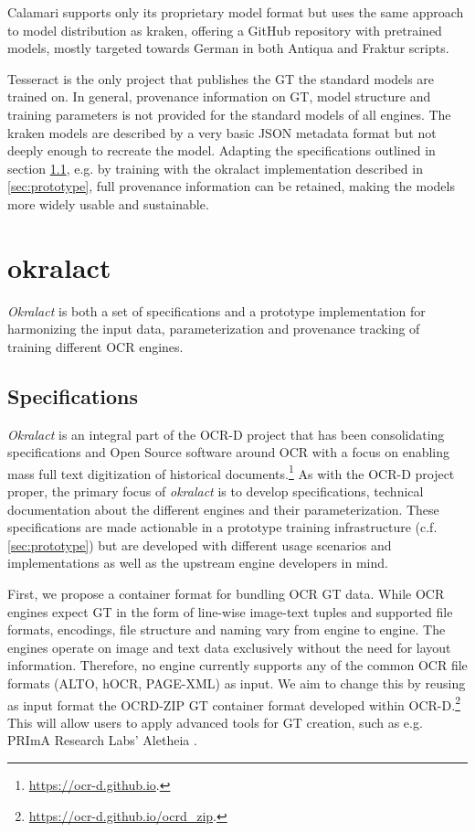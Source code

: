 \documentclass[conference]{IEEEtran}
\begin{document}
Calamari supports only its proprietary model format but uses the same approach
to model distribution as kraken, offering a GitHub repository with pretrained
models, mostly targeted towards German in both Antiqua and Fraktur scripts.


Tesseract is the only project that publishes the GT the standard models are
trained on. In general, provenance information on GT, model structure and training 
parameters is not provided for the standard models of all engines.
The kraken models are described by a very basic JSON metadata format but not
deeply enough to recreate the model. Adapting the specifications outlined
in section \ref{sec:specs}, e.g. by training with the okralact implementation
described in \ref{sec:prototype}, full provenance information can be retained,
making the models more widely usable and sustainable.


\section{okralact}


\textit{Okralact} is both a set of specifications and a prototype
implementation for harmonizing the input data, parameterization and
provenance tracking of training different OCR engines.

\subsection{Specifications}
\label{sec:specs}

\textit{Okralact} is an integral part of the OCR-D project that has been
consolidating specifications and Open Source software around OCR
with a focus on enabling mass full text digitization of historical
documents.\footnote{\url{https://ocr-d.github.io}.} As with the
OCR-D project proper, the primary focus of \textit{okralact} is to develop
specifications, technical documentation about the different engines
and their parameterization. These specifications are made
actionable in a prototype training infrastructure (c.f.
\ref{sec:prototype}) but are developed with different usage
scenarios and implementations as well as the upstream engine
developers in mind.

First, we propose a container format for bundling OCR GT data.
While OCR engines expect GT in the form of line-wise image-text
tuples and supported file formats, encodings, file structure and
naming vary from engine to engine. The engines operate on image and
text data exclusively without the need for layout information.
Therefore, no engine currently supports any of the common OCR file
formats (ALTO, hOCR, PAGE-XML) as input. We aim to change this by
reusing as input format the OCRD-ZIP GT container format developed
within OCR-D.\footnote{\url{https://ocr-d.github.io/ocrd_zip}.}
\cite{boenig2019datech} This will allow users to apply advanced
tools for GT creation, such as e.g.  PRImA Research Labs' Aletheia
\cite{clausner2011aletheia}.
\end{document}
